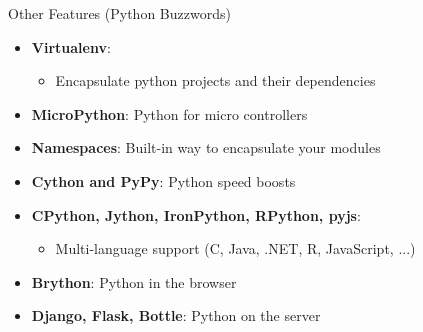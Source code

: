 \documentclass[11pt]{beamer}
\begin{document}
		\begin{frame}[fragile]{Other Features (Python Buzzwords)}
			\begin{itemize}
				\item \textbf{Virtualenv}:
				\begin{itemize}
					\item[] Encapsulate python projects and their dependencies
				
				\end{itemize}
				\item \textbf{MicroPython}: Python for micro controllers 
				\item \textbf{Namespaces}: Built-in way to encapsulate your modules
				\item \textbf{Cython and PyPy}: Python speed boosts
				\item \textbf{CPython, Jython, IronPython, RPython, pyjs}: 
				\begin{itemize}
					\item[] Multi-language support (C, Java, .NET, R, JavaScript, ...)
				\end{itemize}
				\item \textbf{Brython}: Python in the browser
				\item \textbf{Django, Flask, Bottle}: Python on the server
			\end{itemize}
		\end{frame}
		
\end{document}
